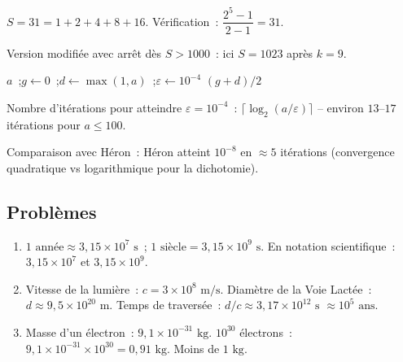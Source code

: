 $S=31=1+2+4+8+16$. V\'erification~: $\dfrac{2^5-1}{2-1}=31$.\checkmark

Version modifi\'ee avec arr\^et d\`es $S>1000$~: ici $S=1023$ apr\`es $k=9$.


\begin{algorithm}[H]
\caption{$\sqrt{a}$ par dichotomie}
\Lire $a$~;\quad $g\leftarrow0$~;\quad $d\leftarrow\max(1,a)$~;\quad $\varepsilon\leftarrow10^{-4}$\;
\Afficher $(g+d)/2$\;
\end{algorithm}

Nombre d'it\'erations pour atteindre $\varepsilon=10^{-4}$~:
$\lceil\log_2(a/\varepsilon)\rceil$ -- environ $13$--$17$ it\'erations pour $a\leq100$.

Comparaison avec H\'eron~: H\'eron atteint $10^{-8}$ en $\approx5$ it\'erations
(convergence quadratique vs logarithmique pour la dichotomie).

\subsection*{Probl\`emes}


\begin{enumerate}
  \item $1\text{ ann\'ee}\approx3{,}15\times10^7\text{ s}$~;
        $1\text{ si\`ecle}=3{,}15\times10^9\text{ s}$.
        En notation scientifique~: $3{,}15\times10^7$ et $3{,}15\times10^9$.
  \item Vitesse de la lumi\`ere~: $c=3\times10^8\text{ m/s}$.
        Diam\`etre de la Voie Lact\'ee~: $d\approx9{,}5\times10^{20}\text{ m}$.
        Temps de travers\'ee~: $d/c\approx3{,}17\times10^{12}\text{ s}$
        $\approx10^5\text{ ans}$.
  \item Masse d'un \'electron~: $9{,}1\times10^{-31}\text{ kg}$.
        $10^{30}$ \'electrons~: $9{,}1\times10^{-31}\times10^{30}=0{,}91\text{ kg}$.
        Moins de $1\text{ kg}$.
\end{enumerate}


